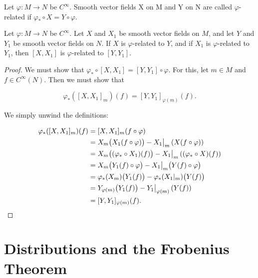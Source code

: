 \begin{definition}\label{thm:1.54}
	Let  $ \varphi: M \to N $ be  $ C^\infty $. Smooth vector fields X on M and Y on N are called  $ \varphi $-related if  $ \varphi_{*} \circ X = Y \circ \varphi $.

\end{definition}

\begin{proposition}\label{thm:1.55}
	Let $\varphi: M \to N$ be $C^\infty$. Let $X$ and $X_1$ be smooth vector fields on $M$, and let $Y$ and $Y_1$ be smooth vector fields on $N$. If $X$ is $\varphi$-related to $Y$, and if $X_1$ is $\varphi$-related to $Y_1$, then $[X, X_1]$ is $\varphi$-related to $[Y, Y_1]$.

\end{proposition}

\begin{proof}
	We must show that $\varphi_{*} \circ [X, X_1] = [Y, Y_1] \circ \varphi$. For this, let  $ m \in M $ and  $f \in C^{\infty}(N)$. Then we must show that

	\begin{equation}
		\tag{1}\label{eq:1.55:1}
		\varphi_{*}([X,X_{1}]_{m})(f)=[Y,Y_{1}]_{\varphi(m)}(f).
	\end{equation}

	We simply unwind the definitions:

	\[
		\begin{aligned}{\varphi_{*}([X,X_{1}]_{m})(f)}&{{}=[X,X_{1}]_{m}(f\circ\varphi)}\\ {}&{{}=X_{m}\big(X_{1}(f\circ\varphi)\big)-X_{1}\big|_{m}\left(X(f\circ\varphi)\right)}\\ {}&{{}=X_{m}\big((\varphi_{*}\circ X_{1})(f)\big)-X_{1}\big|_{m}\left((\varphi_{*}\circ X)(f)\right)}\\ {}&{{}=X_{m}\big(Y_{1}(f)\circ\varphi\big)-X_{1}\big|_{m}\big(Y(f)\circ\varphi\big)}\\ {}&{{}=\varphi_{*}(X_{m})\big(Y_{1}(f)\big)-\varphi_{*}(X_{1}|_{m})\big(Y(f)\big)}\\ {}&{{}=Y_{\varphi(m)}\big(Y_{1}(f)\big)-Y_{1}\big|_{\varphi(m)}\left(Y(f)\right)}\\ {}&{{}=[Y,Y_{1}]_{\varphi(m)}(f).}\\ \end{aligned}
		\qedhere
	\]
\end{proof}

\section{Distributions and the Frobenius Theorem}


